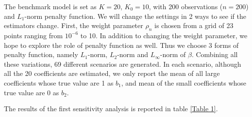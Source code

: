 \documentclass[12pt,pdftex,letterpaper]{article}
\begin{document}
\indent The benchmark model is set as $K=20$, $K_{0}=10$, with 200 observations ($n=200$) and $L_{1}$-norm  penalty function. We will change the settings in 2 ways to see if the estimators change. First, the weight parameter $\rho_{n}$ is chosen from a grid of 23 points ranging from $10^{-6}$ to 10. In addition to changing the weight parameter, we hope to explore the role of penalty function as well. Thus we choose 3 forms of penalty function, namely $L_{1}$-norm, $L_{2}$-norm  and $L_{\infty}$-norm of $\beta$. Combining all these variations, 69 different scenarios are generated. In each scenario, although all the 20 coefficients are estimated, we only report the mean of all large coefficients whose true value are 1 as $b_{1}$, and mean of the small coefficients whose true value are 0 as $b_{2}$. 

\indent The results of the first sensitivity analysis is reported in table \ref{Table 1}.
\end{document}
